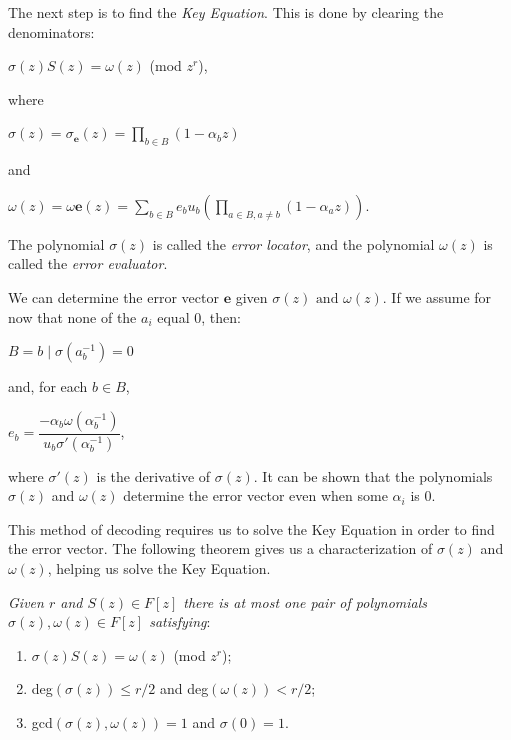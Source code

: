 \documentclass{article}
\begin{document}
The next step is to find the \textit{Key Equation}. This is done by clearing the denominators:
\begin{center}
$\sigma(z)S(z) = \omega(z)$ (mod $z^{r}$),
\end{center}
where
\begin{center}
$\sigma(z) = \sigma_{\textbf{e}}(z) = \prod\limits_{b \in B} (1 - \alpha_{b}z)$
\end{center}
and
\begin{center}
$\omega(z) = \omega{\textbf{e}}(z) = \sum\limits_{b \in B} e_{b}u_{b}\left(\prod\limits_{a \in B, a \neq b} (1 - \alpha_{a}z)\right)$.
\end{center}
The polynomial $\sigma(z)$ is called the \textit{error locator}, and the polynomial $\omega(z)$ is called the \textit{error evaluator}.

We can determine the error vector $\textbf{e}$ given $\sigma(z) \text{ and } \omega(z)$. If we assume for now that none of the $a_{i}$ equal 0, then:
\begin{center}
$B = {b \mid \sigma(a_{b}^{-1}) = 0}$
\end{center}
and, for each $b \in B$,
\begin{center}
$e_{b} = \dfrac{-\alpha_{b}\omega(\alpha_{b}^{-1})}{u_{b}\sigma'(\alpha_{b}^{-1})}$,
\end{center}
where $\sigma'(z)$ is the derivative of $\sigma(z)$. It can be shown that the polynomials $\sigma(z)$ and $\omega(z)$ determine the error vector even when some $\alpha_{i}$ is 0.

This method of decoding requires us to solve the Key Equation in order to find the error vector. The following theorem gives us a characterization of $\sigma(z)$ and $\omega(z)$, helping us solve the Key Equation.

\textit{Given $r$ and $S(z) \in F[z]$ there is at most one pair of polynomials $\sigma(z),\omega(z) \in F[z]$ satisfying}:
\begin{enumerate}
	\item $\sigma(z)S(z) = \omega(z)$ (mod $z^{r}$);
	\item deg$(\sigma(z)) \le r/2$ and deg$(\omega(z)) < r/2$;
	\item gcd$(\sigma(z),\omega(z)) = 1$ and $\sigma(0) = 1$.
\end{enumerate}
\end{document}
